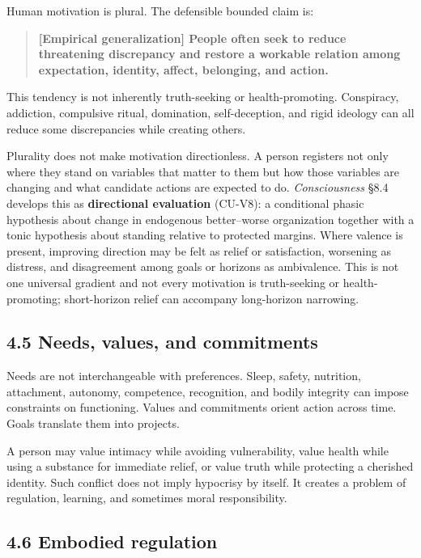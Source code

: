 \documentclass[
  11pt,
]{article}
\begin{document}
Human motivation is plural. The defensible bounded claim is:

\begin{quote}
\textbf{{[}Empirical generalization{]} People often seek to reduce
threatening discrepancy and restore a workable relation among
expectation, identity, affect, belonging, and action.}
\end{quote}

This tendency is not inherently truth-seeking or health-promoting.
Conspiracy, addiction, compulsive ritual, domination, self-deception,
and rigid ideology can all reduce some discrepancies while creating
others.

Plurality does not make motivation directionless. A person registers not
only where they stand on variables that matter to them but how those
variables are changing and what candidate actions are expected to do.
\emph{Consciousness} §8.4 develops this as \textbf{directional
evaluation} (CU-V8): a conditional phasic hypothesis about change in
endogenous better--worse organization together with a tonic hypothesis
about standing relative to protected margins. Where valence is present,
improving direction may be felt as relief or satisfaction, worsening as
distress, and disagreement among goals or horizons as ambivalence. This
is not one universal gradient and not every motivation is truth-seeking
or health-promoting; short-horizon relief can accompany long-horizon
narrowing.

\subsection{4.5 Needs, values, and
commitments}\label{needs-values-and-commitments}

Needs are not interchangeable with preferences. Sleep, safety,
nutrition, attachment, autonomy, competence, recognition, and bodily
integrity can impose constraints on functioning. Values and commitments
orient action across time. Goals translate them into projects.

A person may value intimacy while avoiding vulnerability, value health
while using a substance for immediate relief, or value truth while
protecting a cherished identity. Such conflict does not imply hypocrisy
by itself. It creates a problem of regulation, learning, and sometimes
moral responsibility.

\subsection{4.6 Embodied regulation}\label{embodied-regulation}
\end{document}
